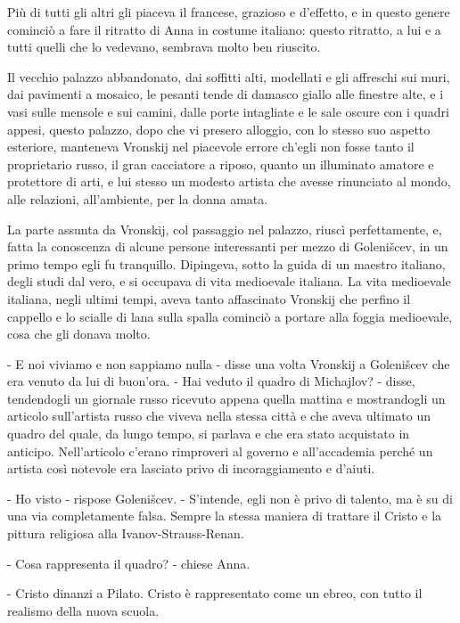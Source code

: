 Più di tutti gli altri gli piaceva il francese, grazioso e d'effetto, e in questo genere cominciò a fare il ritratto di Anna in costume italiano: questo ritratto, a lui e a tutti quelli che lo vedevano, sembrava molto ben riuscito. 

\label{ix-4} 

Il vecchio palazzo abbandonato, dai soffitti alti, modellati e gli affreschi sui muri, dai pavimenti a mosaico, le pesanti tende di damasco giallo alle finestre alte, e i vasi sulle mensole e sui camini, dalle porte intagliate e le sale oscure con i quadri appesi, questo palazzo, dopo che vi presero alloggio, con lo stesso suo aspetto esteriore, manteneva Vronskij nel piacevole errore ch'egli non fosse tanto il proprietario russo, il gran cacciatore a riposo, quanto un illuminato amatore e protettore di arti, e lui stesso un modesto artista che avesse rinunciato al mondo, alle relazioni, all'ambiente, per la donna amata. 

La parte assunta da Vronskij, col passaggio nel palazzo, riuscì perfettamente, e, fatta la conoscenza di alcune persone interessanti per mezzo di Golenišcev, in un primo tempo egli fu tranquillo. Dipingeva, sotto la guida di un maestro italiano, degli studi dal vero, e si occupava di vita medioevale italiana. La vita medioevale italiana, negli ultimi tempi, aveva tanto affascinato Vronskij che perfino il cappello e lo scialle di lana sulla spalla cominciò a portare alla foggia medioevale, cosa che gli donava molto. 

- E noi viviamo e non sappiamo nulla - disse una volta Vronskij a Golenišcev che era venuto da lui di buon'ora. - Hai veduto il quadro di Michajlov? - disse, tendendogli un giornale russo ricevuto appena quella mattina e mostrandogli un articolo sull'artista russo che viveva nella stessa città e che aveva ultimato un quadro del quale, da lungo tempo, si parlava e che era stato acquistato in anticipo. Nell'articolo c'erano rimproveri al governo e all'accademia perché un artista così notevole era lasciato privo di incoraggiamento e d'aiuti. 

- Ho visto - rispose Golenišcev. - S'intende, egli non è privo di talento, ma è su di una via completamente falsa. Sempre la stessa maniera di trattare il Cristo e la pittura religiosa alla Ivanov-Strauss-Renan. 

- Cosa rappresenta il quadro? - chiese Anna. 

- Cristo dinanzi a Pilato. Cristo è rappresentato come un ebreo, con tutto il realismo della nuova scuola. 


